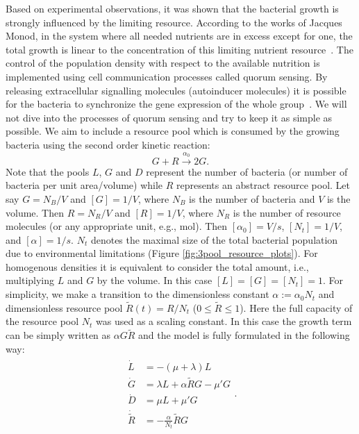 \documentclass[10pt,A4paper]{article}
\numberwithin{equation}{section}
\begin{document}
Based on experimental observations, it was shown that the bacterial growth is strongly influenced by the limiting resource.
According to the works of Jacques Monod, in the system where all needed nutrients are in excess except for one, the total growth is linear to the concentration of this limiting nutrient resource~\cite{monod_growth_1949}.
The control of the population density with respect to the available nutrition is implemented using cell communication processes called quorum sensing.
By releasing extracellular signalling molecules (autoinducer molecules) it is possible for the bacteria to synchronize the gene expression of the whole group~\cite{ng_bacterial_2009}.
We will not dive into the processes of quorum sensing and try to keep it as simple as possible.
We aim to include a resource pool which is consumed by the growing bacteria using the second order kinetic reaction:
\begin{equation}
    G + R  \stackrel{\alpha_0}{\longrightarrow} 2G.
\end{equation}
Note that the pools $L$, $G$ and $D$ represent the number of bacteria (or number of bacteria per unit area/volume) while $R$ represents an abstract resource pool.
Let say $G=N_B/V$ and $[G]=1/V$, where $N_B$ is the number of bacteria and $V$ is the volume.
Then $R=N_R/V$ and $[R]=1/V$, where $N_R$ is the number of resource molecules (or any appropriate unit, e.g., mol).
Then $[\alpha_0]=V/s$, $[N_t]=1/V$, and $[\alpha]=1/s$.
$N_t$ denotes the maximal size of the total bacterial population due to environmental limitations (Figure \ref{fig:3pool_resource_plots}).
For homogenous densities it is equivalent to consider the total amount, i.e., multiplying $L$ and $G$ by the volume.
In this case $[L]=[G]=[N_t]=1$.
For simplicity, we make a transition to the dimensionless constant $\alpha:=\alpha_0 N_t$ and dimensionless resource pool $\tilde{R}(t) = R/ N_t$ ($0 \leqslant \tilde{R} \leqslant 1$).
Here the full capacity of the resource pool $N_t$ was used as a scaling constant.
In this case the growth term can be simply written as $\alpha G \tilde{R}$ and the model is fully formulated in the following way:
\begin{align}
    \begin{split}
        \dot{L} &= -(\mu + \lambda) L\\
        \dot{G} &= \lambda L + \alpha \tilde{R} G-\mu' G\\
        \dot{D} &= \mu  L + \mu' G\\
        \dot{\tilde{R}} &= - \frac{\alpha}{N_t} \tilde{R} G
    \end{split}.
\label{eq:ode_3pool_resource}
\end{align}
\end{document}
